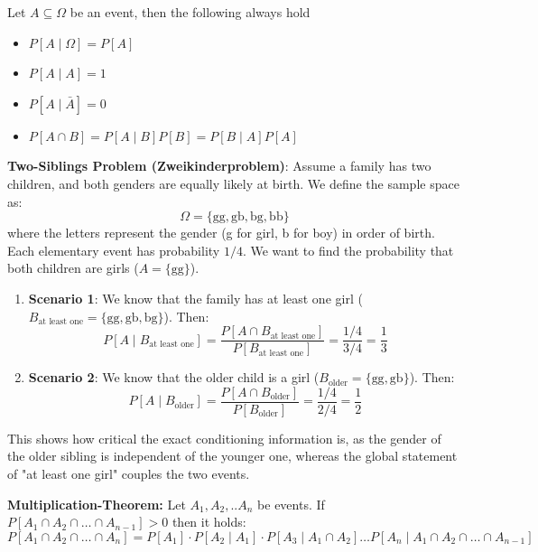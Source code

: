 \begin{remark}
	Let $A \subseteq \Omega$ be an event, then the following always hold
	\begin{itemize}
		\item $P[A \mid \Omega] = P[A]$
		\item $P[A \mid A] = 1$
		\item $P[A \mid \bar{A}] = 0$
		\item $P[A \cap B] = P[A \mid B] P[B] = P[B \mid A] P[A]$
	\end{itemize}
\end{remark}

\begin{example}
	\textbf{Two-Siblings Problem (Zweikinderproblem)}:
	Assume a family has two children, and both genders are equally likely at birth. We define the sample space as:
	$$\Omega = \{ \text{gg}, \text{gb}, \text{bg}, \text{bb} \}$$
	where the letters represent the gender (g for girl, b for boy) in order of birth. Each elementary event has probability $1/4$.
	We want to find the probability that both children are girls ($A = \{ \text{gg} \}$).

	\begin{enumerate}
		\item \textbf{Scenario 1}: We know that the family has at least one girl ($B_{\text{at least one}} = \{ \text{gg}, \text{gb}, \text{bg} \}$). Then:
		      $$P[A \mid B_{\text{at least one}}] = \frac{P[A \cap B_{\text{at least one}}]}{P[B_{\text{at least one}}]} = \frac{1/4}{3/4} = \frac{1}{3}$$
		\item \textbf{Scenario 2}: We know that the older child is a girl ($B_{\text{older}} = \{ \text{gg}, \text{gb} \}$). Then:
		      $$P[A \mid B_{\text{older}}] = \frac{P[A \cap B_{\text{older}}]}{P[B_{\text{older}}]} = \frac{1/4}{2/4} = \frac{1}{2}$$
	\end{enumerate}
	This shows how critical the exact conditioning information is, as the gender of the older sibling is independent of the younger one, whereas the global statement of "at least one girl" couples the two events.
\end{example}

\begin{theorem}
	\textbf{Multiplication-Theorem: } Let $A_1, A_2, .. A_n$ be events. If $P[A_1 \cap A_2 \cap \dots \cap A_{n-1}] > 0$ then it holds:
	$$P[A_1 \cap A_2 \cap \dots \cap A_n] = P[A_1] \cdot P[A_2 \mid A_1] \cdot P[A_3 \mid A_1 \cap A_2] \dots P[A_n \mid A_1 \cap A_2 \cap \dots \cap A_{n-1}]$$

\end{theorem}

